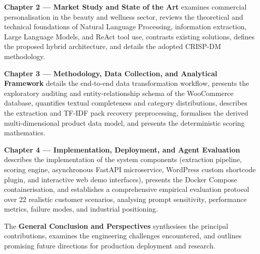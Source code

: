 \textbf{Chapter 2 --- Market Study and State of the Art} examines commercial personalisation in the beauty and wellness sector, reviews the theoretical and technical foundations of Natural Language Processing, information extraction, Large Language Models, and ReAct tool use, contrasts existing solutions, defines the proposed hybrid architecture, and details the adopted CRISP-DM methodology.

\textbf{Chapter 3 --- Methodology, Data Collection, and Analytical Framework} details the end-to-end data transformation workflow, presents the exploratory auditing and entity-relationship schema of the WooCommerce database, quantifies textual completeness and category distributions, describes the extraction and TF-IDF pack recovery preprocessing, formalises the derived multi-dimensional product data model, and presents the deterministic scoring mathematics.

\textbf{Chapter 4 --- Implementation, Deployment, and Agent Evaluation} describes the implementation of the system components (extraction pipeline, scoring engine, asynchronous FastAPI microservice, WordPress custom shortcode plugin, and interactive web demo interfaces), presents the Docker Compose containerisation, and establishes a comprehensive empirical evaluation protocol over 22 realistic customer scenarios, analysing prompt sensitivity, performance metrics, failure modes, and industrial positioning.

The \textbf{General Conclusion and Perspectives} synthesises the principal contributions, examines the engineering challenges encountered, and outlines promising future directions for production deployment and research.

\clearpage
